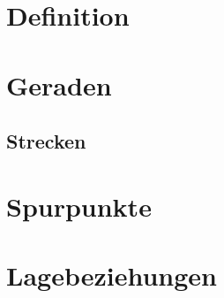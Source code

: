 \documentclass{article}
\begin{document}
\section{Definition}
\section{Geraden} 
\subsection{Strecken}
\section{Spurpunkte} 
\section{Lagebeziehungen}
\end{document}
